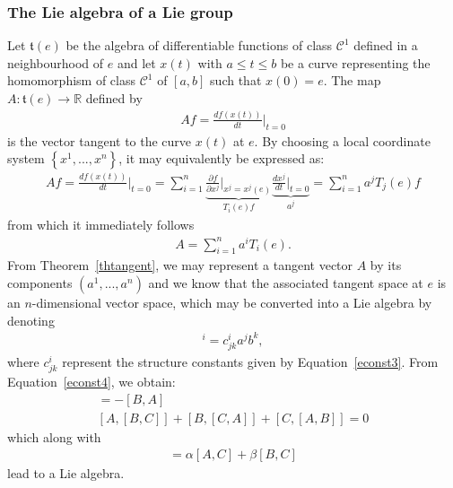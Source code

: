 \documentclass[12pt,a4paper]{report}
\theoremstyle{definition}
\theoremstyle{remark}
\theoremstyle{remark}
\begin{document}
\subsubsection{The Lie algebra of a Lie group}
Let $\mathfrak{t}(e)$ be the algebra of differentiable functions of class $\mathcal{C}^1$ defined in a neighbourhood of $e$ and let $x(t)$ with $a\leq t \leq b$ be a curve representing the homomorphism of class $\mathcal{C}^1$ of $[a,b]$ such that $x(0)=e$. The map $A:\mathfrak{t}(e)\rightarrow\mathbb{R}$ defined by
\begin{align*}
Af=\frac{df(x(t))}{dt}\bigg\rvert_{t=0}
\end{align*}
is the vector tangent to the curve $x(t)$ at $e$. By choosing a local coordinate system $\left\lbrace x^1,...,x^n \right\rbrace$, it may equivalently be expressed as:
\begin{align*}
Af=\frac{df(x(t))}{dt}\bigg\rvert_{t=0}=\sum_{i=1}^n\underbrace{\frac{\partial f}{\partial x^j}\bigg\rvert_{x^j=x^j(e)}}_{T_i(e)f}\underbrace{\frac{dx^j}{dt}\bigg\rvert_{t=0}}_{a^j}=\sum_{i=1}^na^jT_j(e)f
\end{align*}
from which it immediately follows
\begin{align*}
A=\sum_{i=1}^na^iT_i(e).
\end{align*}
From Theorem~\ref{thtangent}, we may represent a tangent vector $A$ by its components $(a^1,...,a^n)$ and we know that the associated tangent space at $e$ is an $n$-dimensional vector space, which may be converted into a Lie algebra by denoting
\begin{align*}
[A,B]^i=c_{jk}^ia^jb^k,
\end{align*}
where $c_{jk}^i$ represent the structure constants given by Equation~\ref{econst3}. From Equation~\ref{econst4}, we obtain:
\begin{align*}
[A,B]=-[B,A]\\
[A,[B,C]]+[B,[C,A]]+[C,[A,B]]=0
\end{align*}
which along with
\begin{align*}
[\alpha A+\beta B,C]=\alpha[A,C]+\beta[B,C]
\end{align*}
lead to a Lie algebra.
\end{document}
